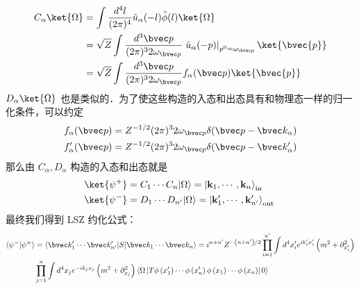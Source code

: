 \begin{equation} \begin{aligned}
C_\alpha\ket{\Omega}&=\int \frac{d^4 {l}}{(2\pi)^4} \tilde{u}_\alpha(-l)\tilde{\phi}(l)\ket{\Omega}\\
&=\sqrt{Z}\int \frac{d^3{\bvec p}}{(2\pi)^3 2\omega_{\bvec p}} \left.\tilde{u}_\alpha(-p)
\right|_{p^0=\omega_{\bvec p}} \ket{\bvec{p}}\\
&=\sqrt{Z}\int \frac{d^3{\bvec p}}{(2\pi)^3 2\omega_{\bvec p}} f_\alpha(\bvec p) \ket{\bvec{p}}
\end{aligned}\end{equation}
$D_\alpha\ket{\Omega}$ 也是类似的．为了使这些构造的入态和出态具有和物理态一样的归一化条件，可以约定
\begin{equation} \begin{aligned}
&f_\alpha(\bvec p)=Z^{-1/2}(2\pi)^3 2\omega_{\bvec p}\delta(\bvec p-\bvec k_\alpha)\\
&f'_\alpha(\bvec p)=Z^{-1/2}(2\pi)^3 2\omega_{\bvec p}\delta(\bvec p-\bvec k'_\alpha)
\end{aligned}\end{equation}
那么由 $C_\alpha,D_\alpha$ 构造的入态和出态就是
\begin{equation} \begin{aligned}
\ket{\psi^+} &=C_1 \cdots C_n|\Omega\rangle=\left|\mathbf{k}_1, \cdots, \mathbf{k}_n\right\rangle_{\text {in }} \\
\ket{\psi^-} &=D_1 \cdots D_{n'}|\Omega\rangle=\left|\mathbf{k}_1^{\prime}, \cdots, \mathbf{k}_{n'}^{\prime}\right\rangle_{\text {out }}
\end{aligned}\end{equation}
最终我们得到 LSZ 约化公式：
\begin{equation} \begin{aligned}
\langle\psi^-|\psi^+\rangle&=\langle\bvec k'_1 \cdots \bvec k'_{n'}|S|\bvec k_1\cdots\bvec k_n\rangle= i^{n+n'} Z^{-\left(n+n'\right) / 2}
\prod_{i=1}^{n'}\int d^4 {x_i'} e^{i k_i' x_i'}\left(m^2+\partial_{x_i'}^2\right)  \\
& \prod_{j=1}^n\int d^4  x_j e^{-i k_j x_j}\left(m^2+\partial_{x_j}^2\right)
\left\langle \Omega\left|T \phi\left(x_1'\right) \cdots \phi\left(x_n'\right) \phi\left(x_{1}\right) \cdots \phi\left(x_{n}\right)\right| 0\right\rangle
\end{aligned}\end{equation} 